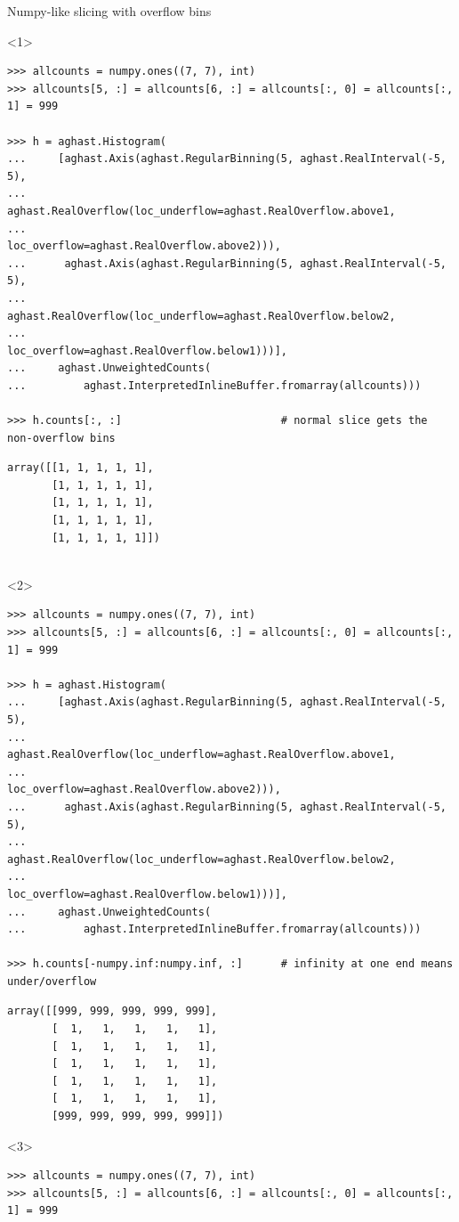 \documentclass[aspectratio=169]{beamer}
\begin{document}
\begin{frame}[fragile]{Numpy-like slicing with overflow bins}
\scriptsize
\vspace{0.4 cm}
\begin{onlyenv}<1>
\begin{verbatim}
>>> allcounts = numpy.ones((7, 7), int)
>>> allcounts[5, :] = allcounts[6, :] = allcounts[:, 0] = allcounts[:, 1] = 999

>>> h = aghast.Histogram(
...     [aghast.Axis(aghast.RegularBinning(5, aghast.RealInterval(-5, 5),
...                  aghast.RealOverflow(loc_underflow=aghast.RealOverflow.above1,
...                                      loc_overflow=aghast.RealOverflow.above2))),
...      aghast.Axis(aghast.RegularBinning(5, aghast.RealInterval(-5, 5),
...                  aghast.RealOverflow(loc_underflow=aghast.RealOverflow.below2,
...                                      loc_overflow=aghast.RealOverflow.below1)))],
...     aghast.UnweightedCounts(
...         aghast.InterpretedInlineBuffer.fromarray(allcounts)))

>>> h.counts[:, :]                         # normal slice gets the non-overflow bins
\end{verbatim}
\begin{verbatim}
array([[1, 1, 1, 1, 1],
       [1, 1, 1, 1, 1],
       [1, 1, 1, 1, 1],
       [1, 1, 1, 1, 1],
       [1, 1, 1, 1, 1]])


\end{verbatim}
\end{onlyenv}
\begin{onlyenv}<2>
\begin{verbatim}
>>> allcounts = numpy.ones((7, 7), int)
>>> allcounts[5, :] = allcounts[6, :] = allcounts[:, 0] = allcounts[:, 1] = 999

>>> h = aghast.Histogram(
...     [aghast.Axis(aghast.RegularBinning(5, aghast.RealInterval(-5, 5),
...                  aghast.RealOverflow(loc_underflow=aghast.RealOverflow.above1,
...                                      loc_overflow=aghast.RealOverflow.above2))),
...      aghast.Axis(aghast.RegularBinning(5, aghast.RealInterval(-5, 5),
...                  aghast.RealOverflow(loc_underflow=aghast.RealOverflow.below2,
...                                      loc_overflow=aghast.RealOverflow.below1)))],
...     aghast.UnweightedCounts(
...         aghast.InterpretedInlineBuffer.fromarray(allcounts)))

>>> h.counts[-numpy.inf:numpy.inf, :]      # infinity at one end means under/overflow
\end{verbatim}
\begin{verbatim}
array([[999, 999, 999, 999, 999], 
       [  1,   1,   1,   1,   1], 
       [  1,   1,   1,   1,   1], 
       [  1,   1,   1,   1,   1], 
       [  1,   1,   1,   1,   1], 
       [  1,   1,   1,   1,   1], 
       [999, 999, 999, 999, 999]])
\end{verbatim}
\end{onlyenv}
\begin{onlyenv}<3>
\begin{verbatim}
>>> allcounts = numpy.ones((7, 7), int)
>>> allcounts[5, :] = allcounts[6, :] = allcounts[:, 0] = allcounts[:, 1] = 999


\end{verbatim}
\end{onlyenv}
\end{frame}
\end{document}

